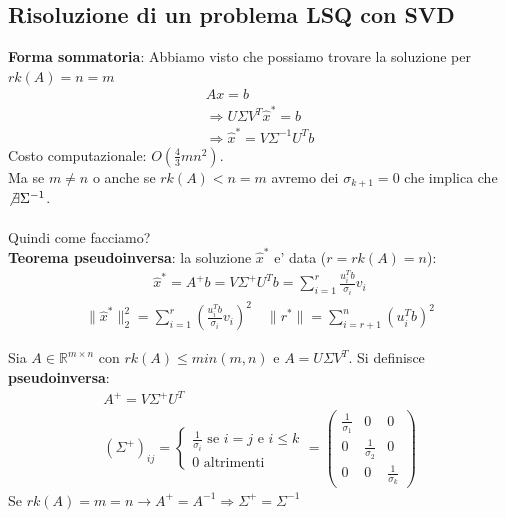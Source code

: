 \documentclass[a4paper,12pt]{article}
\begin{document}
\subsection*{Risoluzione di un problema LSQ con SVD}
\textbf{Forma sommatoria}: Abbiamo visto che possiamo trovare la soluzione per $rk(A) = n = m$
\begin{align*}
        Ax=b \\
        \Rightarrow U \Sigma V^T \hat{x}^* = b \\
        \Rightarrow \boxed{\hat{x}^*  = V \Sigma^{-1}U^T b}
\end{align*}
Costo computazionale: $O(\frac{4}{3}mn^2)$.\\
Ma se $m \neq n$ o anche se $rk(A) < n = m$ avremo dei $\sigma_{k+1} = 0$ che implica che $\not\exists \Sigma^{-1}$. \\
\vspace{1em}\\
Quindi come facciamo? \\
\textbf{Teorema pseudoinversa}: la soluzione $\hat{x}^*$ e' data ($r=rk(A)=n$):
\label{sec:svd_pseudo}
\begin{align*}
    \hat{x}^* = A^+b = V \Sigma^+ U^T b = \sum_{i=1}^r \frac{u_i^T b}{\sigma_i}v_i
\end{align*}
\begin{align*}
    \| \hat{x}^* \|_2^2 = \sum_{i=1}^r (\frac{u_i^T b}{\sigma_i}v_i)^2 \quad \| r^* \| = \sum_{i=r+1}^n (u_i^T b)^2
\end{align*}
\begin{tcolorbox}[colback=blue!5!white, colframe=blue!75!black]
Sia $A \in \mathbb{R}^{m\times n}$ con $rk(A) \leq min(m,n)$ e $A=U\Sigma V^T$. Si definisce \textbf{pseudoinversa}:
\begin{align*}
    A^+ = V \Sigma^+ U^T \\
    (\Sigma^+)_{ij}=\begin{cases}
        \frac{1}{\sigma_i} \text{ se } i=j \text{ e } i \leq k \\
        0 \text{ altrimenti} 
    \end{cases}
    = \begin{pmatrix}
            \frac{1}{\sigma_1} & 0 & 0 \\
            0 & \frac{1}{\sigma_2} & 0 \\
            0 & 0 & \frac{1}{\sigma_k}
        \end{pmatrix}
\end{align*}
Se $rk(A)=m=n \rightarrow A^+=A^{-1} \Rightarrow \Sigma^+ = \Sigma^{-1}$
\end{tcolorbox}
\end{document}
